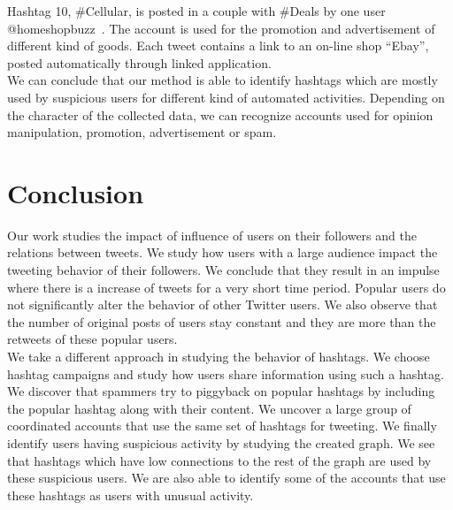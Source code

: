 \documentclass[journal, a4paper, 12pt]{article}
\begin{document}
Hashtag 10, \#Cellular, is posted in a couple with \#Deals by one user @homeshopbuzz~\cite{homeshopbuzz}. The account is used for the promotion and advertisement of different kind of goods. Each tweet contains a link to an on-line shop ``Ebay'', posted automatically through linked application.
\\
 
We can conclude that our method is able to identify hashtags which are mostly used by suspicious users for different kind of automated activities. Depending on the character of the collected data, we can recognize accounts used for opinion manipulation, promotion, advertisement or spam.





      

\section{Conclusion}
Our work studies the impact of influence of users on their followers and the relations between tweets. We study how users with a large audience impact the tweeting behavior of their followers. We conclude that they result in an impulse where there is a increase of tweets for a very short time period. Popular users do not significantly alter the behavior of other Twitter users. We also observe that the number of original posts of users stay constant and they are more than the retweets of these popular users. \\

We take a different approach in studying the behavior of hashtags. We choose hashtag campaigns and study how users share information using such a hashtag. We discover that spammers try to piggyback on popular hashtags by including the popular hashtag along with their content. We uncover a large group of coordinated accounts that use the same set of hashtags for tweeting. We finally identify users having suspicious activity by studying the created graph. We see that hashtags which have low connections to the rest of the graph are used by these suspicious users. We are also able to identify some of the accounts that use these hashtags as users with unusual activity.
\end{document}
